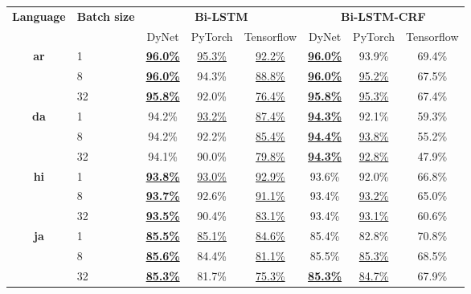 \begin{table}[h]
    \centering
    \begin{tabular}{c l c c c|c c c}
        \toprule
        \multirow{2}{*}{\bfseries Language} &
        \multirow{2}{*}{\bfseries Batch size} &
        \multicolumn{3}{c}{\bfseries Bi-LSTM} &
        \multicolumn{3}{c}{\bfseries Bi-LSTM-CRF} \\
        \cmidrule(lr){3-8}
        && DyNet & PyTorch & Tensorflow & DyNet & PyTorch & Tensorflow \\

        \cmidrule(lr){1-8}
        \multirow{3}{*}{\bfseries ar}
        &  1 & \underline{\textbf{96.0\%}} & \underline{95.3\%} & \underline{92.2\%} & \underline{\textbf{96.0\%}} & 93.9\% & 69.4\% \\
        &  8 & \underline{\textbf{96.0\%}} & 94.3\% & \underline{88.8\%} & \underline{\textbf{96.0\%}} & \underline{95.2\%} & 67.5\% \\
        & 32 & \underline{\textbf{95.8\%}} & 92.0\% & \underline{76.4\%} & \underline{\textbf{95.8\%}} & \underline{95.3\%} & 67.4\% \\

        \cmidrule(lr){1-8}
        \multirow{3}{*}{\bfseries da}
        &  1 & 94.2\% & \underline{93.2\%} & \underline{87.4\%} & \underline{\textbf{94.3\%}} & 92.1\% & 59.3\% \\
        &  8 & 94.2\% & 92.2\% & \underline{85.4\%} & \underline{\textbf{94.4\%}} & \underline{93.8\%} & 55.2\% \\
        & 32 & 94.1\% & 90.0\% & \underline{79.8\%} & \underline{\textbf{94.3\%}} & \underline{92.8\%} & 47.9\% \\

        \cmidrule(lr){1-8}
        \multirow{3}{*}{\bfseries hi}
        &  1 & \underline{\textbf{93.8\%}} & \underline{93.0\%} & \underline{92.9\%} & 93.6\% & 92.0\% & 66.8\% \\
        &  8 & \underline{\textbf{93.7\%}} & 92.6\% & \underline{91.1\%} & 93.4\% & \underline{93.2\%} & 65.0\% \\
        & 32 & \underline{\textbf{93.5\%}} & 90.4\% & \underline{83.1\%} & 93.4\% & \underline{93.1\%} & 60.6\% \\

        \cmidrule(lr){1-8}
        \multirow{3}{*}{\bfseries ja}
        &  1 & \underline{\textbf{85.5\%}} & \underline{85.1\%} & \underline{84.6\%} & 85.4\% & 82.8\% & 70.8\% \\
        &  8 & \underline{\textbf{85.6\%}} & 84.4\% & \underline{81.1\%} & 85.5\% & \underline{85.3\%} & 68.5\% \\
        & 32 & \underline{\textbf{85.3\%}} & 81.7\% & \underline{75.3\%} & \underline{\textbf{85.3\%}} & \underline{84.7\%} & 67.9\% \\


\end{tabular}
\end{table}
